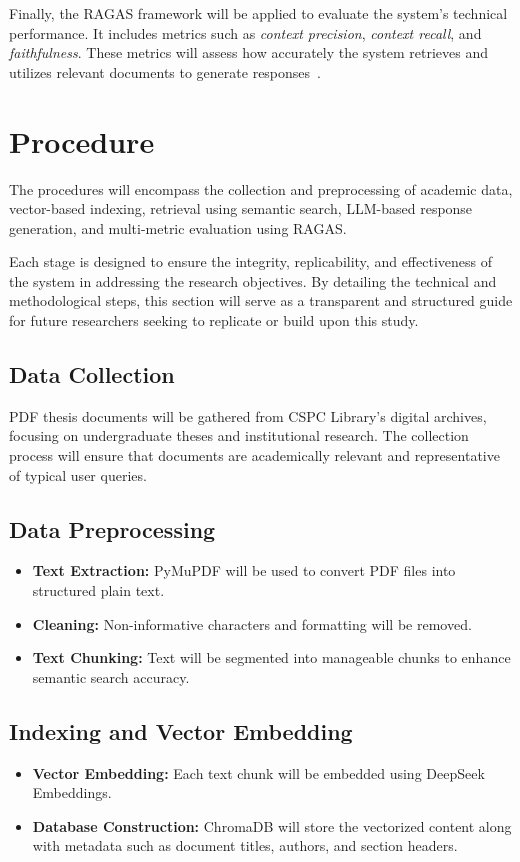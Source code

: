 \begin{refsection}
Finally, the RAGAS framework will be applied to evaluate the system's technical performance. It includes metrics such as \textit{context precision}, \textit{context recall}, and \textit{faithfulness}. These metrics will assess how accurately the system retrieves and utilizes relevant documents to generate responses~\cite{holmes2023chatbot, ameli2024ranking, lin2024satisfaction}.

\section{Procedure}

The procedures will encompass the collection and preprocessing of academic data, vector-based indexing, retrieval using semantic search, LLM-based response generation, and multi-metric evaluation using RAGAS.

Each stage is designed to ensure the integrity, replicability, and effectiveness of the system in addressing the research objectives. By detailing the technical and methodological steps, this section will serve as a transparent and structured guide for future researchers seeking to replicate or build upon this study.

\subsection*{Data Collection}
PDF thesis documents will be gathered from CSPC Library’s digital archives, focusing on undergraduate theses and institutional research. The collection process will ensure that documents are academically relevant and representative of typical user queries.

\subsection*{Data Preprocessing}
\begin{itemize}
    \item \textbf{Text Extraction:} PyMuPDF will be used to convert PDF files into structured plain text.
    \item \textbf{Cleaning:} Non-informative characters and formatting will be removed.
    \item \textbf{Text Chunking:} Text will be segmented into manageable chunks to enhance semantic search accuracy.
\end{itemize}

\subsection*{Indexing and Vector Embedding}
\begin{itemize}
    \item \textbf{Vector Embedding:} Each text chunk will be embedded using DeepSeek Embeddings.
    \item \textbf{Database Construction:} ChromaDB will store the vectorized content along with metadata such as document titles, authors, and section headers.
\end{itemize}


\end{refsection}
